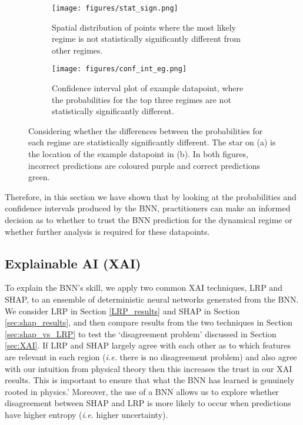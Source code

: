 \documentclass[a4paper]{article}
\begin{document}
\begin{figure}
\begin{subfigure}{0.4\textwidth}
    \centering
    \texttt{[image: figures/stat\_sign.png]}
    \caption{Spatial distribution of points where the most likely regime is not statistically significantly different from other regimes.}
    \label{fig:stat_sign}
\end{subfigure}
\hfill
\begin{subfigure}{0.4\textwidth}
    \centering
    \texttt{[image: figures/conf\_int\_eg.png]}
    \caption{Confidence interval plot of example datapoint, where the probabilities for the top three regimes are not statistically significantly different.}
    \label{fig:cont_int_eg}
\end{subfigure}
\caption{Considering whether the differences between the probabilities for each regime are statistically significantly different. The star on (a) is the location of the example datapoint in (b). In both figures, incorrect predictions are coloured purple and correct predictions green.}
\end{figure}

Therefore, in this section we have shown that by looking at the probabilities and confidence intervals produced by the BNN, practitioners can make an informed decision as to whether to trust the BNN prediction for the dynamical regime or whether further analysis is required for these datapoints.

\subsection{Explainable AI (XAI)} 
To explain the BNN's skill, we apply two common XAI techniques, LRP and SHAP, to an ensemble of deterministic neural networks generated from the BNN. We consider LRP in Section \ref{LRP_results} and SHAP in Section \ref{sec:shap_results}, and then compare results from the two techniques in Section \ref{sec:shap_vs_LRP} to test the `disagreement problem' discussed in Section \ref{sec:XAI}. If LRP and SHAP largely agree with each other as to which features are relevant in each region (\textit{i.e.} there is no disagreement problem) and also agree with our intuition from physical theory then this increases the trust in our XAI results. This is important to ensure that what the BNN has learned is genuinely rooted in physics.' Moreover, the use of a BNN allows us to explore whether disagreement between SHAP and LRP is more likely to occur when predictions have higher entropy (\textit{i.e.} higher uncertainty).
\end{document}
